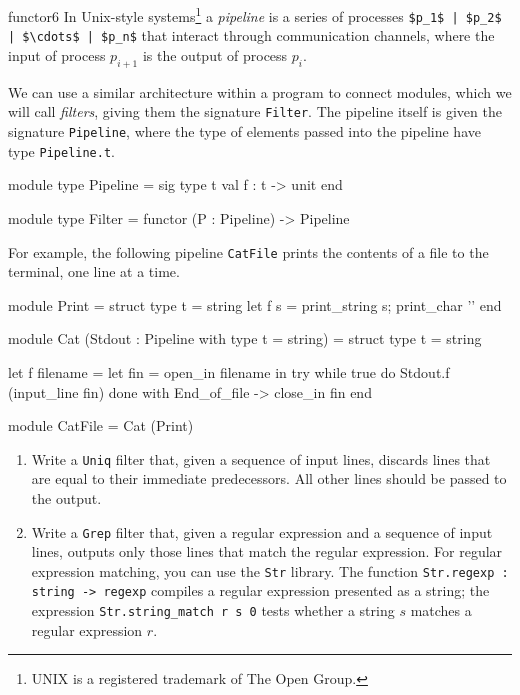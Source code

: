%
%
\begin{exercise}{functor6}
In Unix-style systems\footnote{UNIX\textregistered{} is a registered
trademark of The Open Group.} a \emph{pipeline} is a series of
processes \hbox{\lstinline/$p_1$ | $p_2$ | $\cdots$ | $p_n$/} that
interact through communication channels, where the input of process
$p_{i + 1}$ is the output of process $p_i$.

We can use a similar architecture within a program to connect modules,
which we will call \emph{filters}, giving them the
signature \hbox{\lstinline$Filter$}.  The pipeline itself is given the
signature \hbox{\lstinline$Pipeline$}, where the type of elements
passed into the pipeline have type \hbox{\lstinline$Pipeline.t$}.

\begin{ocaml}
module type Pipeline = sig
   type t
   val f : t -> unit
end

module type Filter = functor (P : Pipeline) -> Pipeline
\end{ocaml}
%
For example, the following pipeline \hbox{\lstinline$CatFile$}
prints the contents of a file to the terminal, one line at a time.

\begin{ocaml}
module Print = struct
   type t = string
   let f s = print_string s; print_char '\n'
end

module Cat (Stdout : Pipeline with type t = string) =
struct
   type t = string

   let f filename =
      let fin = open_in filename in
      try
         while true do Stdout.f (input_line fin) done
      with End_of_file -> close_in fin
end

module CatFile = Cat (Print)
\end{ocaml}

\begin{enumerate}
\item

Write a \hbox{\lstinline$Uniq$} filter that, given a sequence of input
lines, discards lines that are equal to their immediate predecessors.
All other lines should be passed to the output.

\item

Write a \hbox{\lstinline$Grep$} filter that, given a regular
expression and a sequence of input lines, outputs only those lines
that match the regular expression.  For regular expression matching,
you can use the \hbox{\lstinline$Str$} library.  The function
\hbox{\lstinline$Str.regexp : string -> regexp$}
compiles a regular expression presented as a string; the
expression \hbox{\lstinline$Str.string_match r s 0$} tests whether a
string $s$ matches a regular expression $r$.


\end{enumerate}
\end{exercise}
